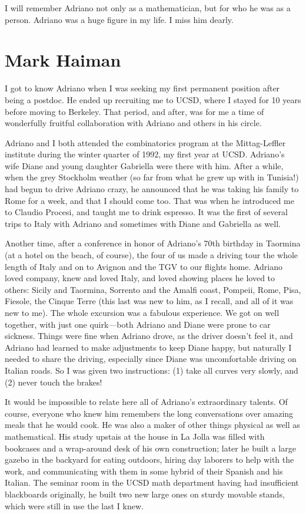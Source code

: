 \documentclass{notices}
\begin{document}
I will remember Adriano not only as a mathematician, but for who he was as a person. Adriano was a huge figure in my life. I miss him dearly.

\section*{Mark Haiman}
I got to know Adriano when I was seeking my first permanent position after being a postdoc.  He ended up recruiting me to UCSD, where I stayed for 10 years before moving to Berkeley.  That period, and after, was for me a time of wonderfully fruitful collaboration with Adriano and others in his circle.

Adriano and I both attended the combinatorics program at the Mittag-Leffler institute during the winter quarter of 1992, my first year at UCSD.   Adriano's wife Diane and young daughter Gabriella were there with him.  After a while, when the grey Stockholm weather (so far from what he grew up with in Tunisia!) had begun to drive Adriano crazy, he announced that he was taking his family to Rome for a week, and that I should come too.  That was when he introduced me to Claudio Procesi, and taught me to drink espresso.  It was the first of several trips to Italy with Adriano and sometimes with Diane and Gabriella as well.

Another time, after a conference in honor of Adriano's 70th birthday in Taormina (at a hotel on the beach, of course), the four of us made a driving tour the whole length of Italy and on to Avignon and the TGV to our flights home.  Adriano loved company, knew and loved Italy, and loved showing places he loved to others: Sicily and Taormina, Sorrento and the Amalfi coast, Pompeii, Rome, Pisa, Fiesole, the Cinque Terre (this last was new to him, as I recall, and all of it was new to me).  The whole excursion was a fabulous experience.  We got on well together, with just one quirk---both Adriano and Diane were prone to car sickness.  Things were fine when Adriano drove, as the driver doesn't feel it, and Adriano had learned to make adjustments to keep Diane happy, but naturally I needed to share the driving, especially since Diane was uncomfortable driving on Italian roads.  So I was given two instructions: (1) take all curves very slowly, and (2) never touch the brakes!

It would be impossible to relate here all of Adriano's extraordinary talents.  Of course, everyone who knew him remembers the long conversations over amazing meals that he would cook.  He was also a maker of other things physical as well as mathematical.  His study upstais at the house in La Jolla was filled with bookcases and a wrap-around desk of his own construction; later he built a large gazebo in the backyard for eating outdoors, hiring day laborers to help with the work, and communicating with them in some hybrid of their Spanish and his Italian.  The seminar room in the UCSD math department having had insufficient blackboards originally, he built two new large ones on sturdy movable stands, which were still in use the last I knew.
\end{document}
